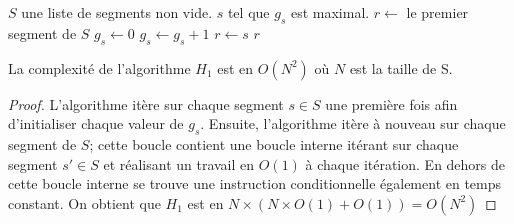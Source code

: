 \begin{algorithm}
  \caption{$H_1$($S$)}
  \begin{algorithmic}[1] \label{algo:h1}
    \REQUIRE $S$ une liste de segments non vide.
    \ENSURE $s$ tel que $g_s$ est maximal.
    \STATE$r\leftarrow$ le premier segment de $S$
    \STATE $g_s\leftarrow 0$
    \ENDFOR
    \STATE $g_s\leftarrow g_s +1$
    \ENDIF
    \ENDFOR
    \STATE $r\leftarrow s$
    \ENDIF
    \ENDFOR
    \RETURN $r$
  \end{algorithmic}
\end{algorithm}

\begin{prop}
  La complexité de l'algorithme $H_1$ est en $O(N^2)$ où $N$ est la taille de S.
\end{prop}
\begin{proof}
  L'algorithme itère sur chaque segment $s \in S$ une première fois afin
  d'initialiser chaque valeur de $g_s$. Ensuite, l'algorithme itère à nouveau
  sur chaque segment de $S$; cette boucle contient une boucle interne
  itérant sur chaque segment $s' \in S$ et réalisant un travail en $O(1)$
  à chaque itération. En dehors de cette boucle interne se trouve une
  instruction
  conditionnelle également en temps constant.
  On obtient que $H_1$ est en $N\times(N\times{}O(1) + O(1)) = O(N^2)$
\end{proof}



